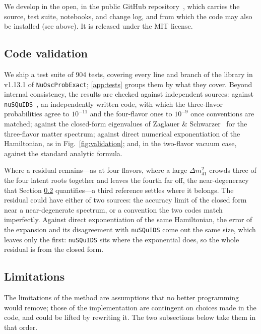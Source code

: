 \documentclass[final,5p,times,twocolumn,sort,compress]{elsarticle}
\newcommand{\fig}{Fig.}
\newcommand{\figu}[1]{\fig~\ref{fig:#1}}
\begin{document}
We develop in the open, in the public GitHub repository\ \cite{NuOscProbExact}, which carries the source, test suite, notebooks, and change log, and from which the code may also be installed (see above).  It is released under the MIT license.


\subsection{Code validation}
\label{sec:validation}

We ship a test suite of 904 tests, covering every line and branch of the library in v1.13.1 of {\tt NuOscProbExact}; \ref{app:tests} groups them by what they cover.  Beyond internal consistency, the results are checked against independent sources: against {\tt nuSQuIDS}\ \cite{Delgado:2014kpa, NuSQuIDS}, an independently written code, with which the three-flavor probabilities agree to $10^{-11}$ and the four-flavor ones to $10^{-9}$ once conventions are matched; against the closed-form eigenvalues of Zaglauer \& Schwarzer\ \cite{Zaglauer:1988gz} for the three-flavor matter spectrum; against direct numerical exponentiation of the Hamiltonian, as in \figu{validation}; and, in the two-flavor vacuum case, against the standard analytic formula.

Where a residual remains---as at four flavors, where a large $\Delta m_{41}^2$ crowds three of the four latent roots together and leaves the fourth far off, the near-degeneracy that Section \ref{sec:limitations} quantifies---a third reference settles where it belongs.  The residual could have either of two sources: the accuracy limit of the closed form near a near-degenerate spectrum, or a convention the two codes match imperfectly.  Against direct exponentiation of the same Hamiltonian, the error of the expansion and its disagreement with {\tt nuSQuIDS} come out the same size, which leaves only the first: {\tt nuSQuIDS} sits where the exponential does, so the whole residual is from the closed form.


\subsection{Limitations}
\label{sec:limitations}

The limitations of the method are assumptions that no better programming would remove; those of the implementation are contingent on choices made in the code, and could be lifted by rewriting it.  The two subsections below take them in that order.
\end{document}
